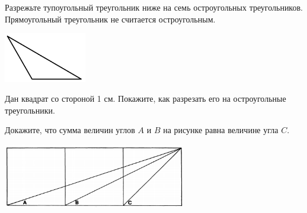 ﻿
\begin{itemize}

\itA Разрежьте тупоугольный треугольник ниже на семь остроугольных треугольников. Прямоугольный треугольник не считается остроугольным.

\vspace{-0.6cm}
\begin{center}
\includegraphics[width=3.6cm]{stats/2017/images/z_obtuse.png}
\end{center} \vspace{-0.7cm}

\itB Дан квадрат со стороной 1 см. Покажите, как разрезать его на остроугольные треугольники.

\itC Докажите, что сумма величин углов $A$ и $B$ на рисунке равна величине угла $C$.

\vspace{-0.4cm}
\begin{center}
\includegraphics[width=8cm]{stats/2017/images/z_threesquares.png}
\end{center} \vspace{-0.4cm}
\end{itemize}